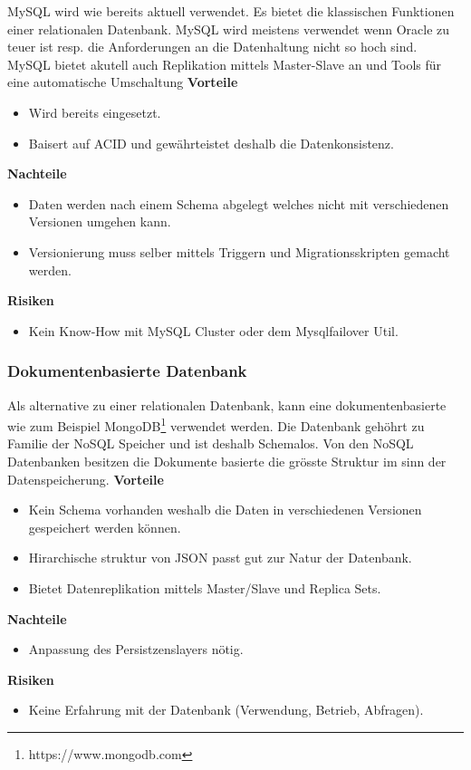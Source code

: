 MySQL wird wie bereits aktuell verwendet. Es bietet die klassischen Funktionen einer relationalen Datenbank. MySQL wird meistens verwendet wenn Oracle zu teuer ist resp. die Anforderungen an die Datenhaltung nicht so hoch sind. MySQL bietet akutell auch Replikation mittels Master-Slave an und Tools für eine automatische Umschaltung
\newline
\newline
\textbf{Vorteile}
\begin{itemize}
	\item Wird bereits eingesetzt.
	\item Baisert auf \gls{ACID} und gewährteistet deshalb die Datenkonsistenz.
\end{itemize}
\textbf{Nachteile}
\begin{itemize}
	\item Daten werden nach einem Schema abgelegt welches nicht mit verschiedenen Versionen umgehen kann.
	\item Versionierung muss selber mittels Triggern und Migrationsskripten gemacht werden.
\end{itemize}
\textbf{Risiken}
\begin{itemize}
	\item Kein Know-How mit MySQL Cluster oder dem Mysqlfailover Util.
\end{itemize}

\subsubsection{Dokumentenbasierte Datenbank}

Als alternative zu einer relationalen Datenbank, kann eine dokumentenbasierte wie zum Beispiel MongoDB\footnote{https://www.mongodb.com} verwendet werden. Die Datenbank gehöhrt zu Familie der \Gls{NoSQL} Speicher und ist deshalb Schemalos. Von den \gls{NoSQL} Datenbanken besitzen die Dokumente basierte die grösste Struktur im sinn der Datenspeicherung.
\newline
\newline
\textbf{Vorteile}
\begin{itemize}
	\item Kein Schema vorhanden weshalb die Daten in verschiedenen Versionen gespeichert werden können.
	\item Hirarchische struktur von JSON passt gut zur Natur der Datenbank.
	\item Bietet Datenreplikation mittels Master/Slave und Replica Sets.
\end{itemize}
\textbf{Nachteile}
\begin{itemize}
	\item Anpassung des Persistzenslayers nötig.
\end{itemize}
\textbf{Risiken}
\begin{itemize}
	\item Keine Erfahrung mit der Datenbank (Verwendung, Betrieb, Abfragen).
\end{itemize}

